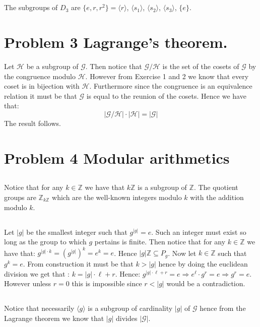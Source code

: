 \documentclass[10pt,a4paper]{book}
\begin{document}
\subsection{}
The subgroups of $D_3$ are $\{e, r, r^2\} = \langle r \rangle$, $\langle s_1 \rangle$, $\langle s_2 \rangle$, $\langle s_3 \rangle$, $\{e\}$. 

\section{Problem 3 Lagrange's theorem.}
Let $\mathcal{H}$ be a subgroup of $\mathcal{G}$. Then notice that $\mathcal{G} / \mathcal{H}$ is the set of the cosets of $\mathcal{G}$ by the congruence modulo $\mathcal{H}$. However from Exercise 1 and 2 we know that every coset is in bijection with $\mathcal{H}$. Furthermore since the congruence is an equivalence relation it must be that $\mathcal{G}$ is equal to the reunion of the cosets. Hence we have that:
\[
|\mathcal{G} / \mathcal{H} | \cdot |\mathcal{H} | = | \mathcal{G} | 
\]
The result follows.

\section{Problem 4 Modular arithmetics}
\subsection{}
Notice that for any $k \in \mathbb{Z}$ we have that $k\mathbb{Z}$ is a subgroup of $\mathbb{Z}$. The quotient groups are $\mathbb{Z}_{k\mathbb{Z}}$ which are the well-known integers modulo $k$ with the addition modulo $k$.

\subsection{}
Let $|g|$ be the smallest integer such that $g^{|g|} = e$. Such an integer must exist so long as the group to which $g$ pertains is finite. Then notice that for any $k \in \mathbb{Z}$ we have that: $g^{|g|\cdot k} = (g^{|g|})^{k} = e^k = e$. Hence $|g|\mathbb{Z} \subseteq P_g$. Now let $k \in \mathbb{Z}$ such that $g^k = e$. From construction it must be that $k > |g|$ hence by doing the euclidean division we get that : $k = |g|\cdot \ell + r$. Hence: $g^{|g| \cdot \ell + r} = e \Rightarrow e^\ell \cdot g^r = e \Rightarrow g^r = e$. However unless $r = 0$ this is impossible since $r < |g|$ would be a contradiction.

\subsection{}
Notice that necessarily $\langle g \rangle$ is a subgroup of cardinality $|g|$ of $\mathcal{G}$ hence from the Lagrange theorem we know that $|g|$ divides $|\mathcal{G}|$.
\end{document}
